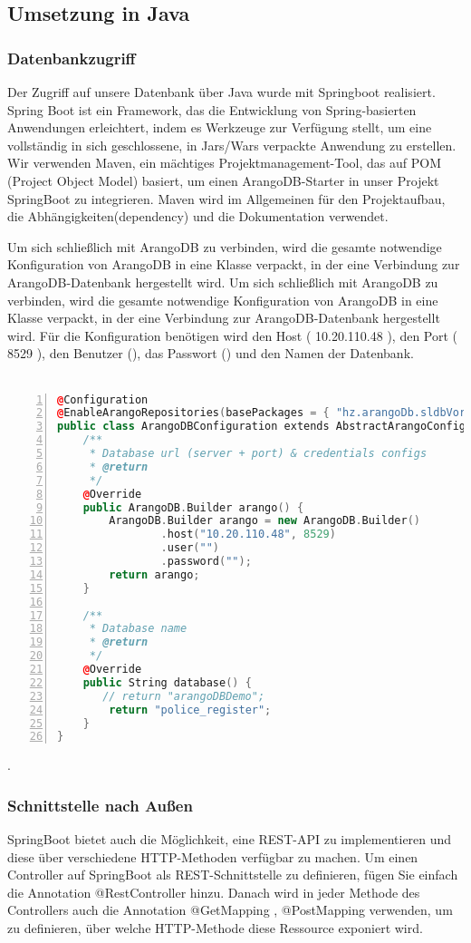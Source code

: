 \subsection{Umsetzung in Java}
\subsubsection{Datenbankzugriff}
Der Zugriff auf unsere Datenbank über Java wurde mit Springboot realisiert. Spring Boot ist ein Framework, das die Entwicklung von Spring-basierten Anwendungen erleichtert, indem es Werkzeuge zur Verfügung stellt, um eine vollständig in sich geschlossene, in Jars/Wars verpackte Anwendung zu erstellen. Wir verwenden Maven, ein mächtiges Projektmanagement-Tool, das auf  POM (Project Object Model) basiert, um einen ArangoDB-Starter in unser Projekt SpringBoot zu integrieren. Maven wird im Allgemeinen für den Projektaufbau, die Abhängigkeiten(dependency) und die Dokumentation verwendet.

Um sich schließlich mit ArangoDB zu verbinden, wird die gesamte notwendige Konfiguration von ArangoDB in eine Klasse verpackt, in der eine Verbindung zur ArangoDB-Datenbank hergestellt wird. Um sich schließlich mit ArangoDB zu verbinden, wird die gesamte notwendige Konfiguration von ArangoDB in eine Klasse verpackt, in der eine Verbindung zur ArangoDB-Datenbank hergestellt wird. Für die Konfiguration benötigen wird den Host ( 10.20.110.48 ), den Port ( 8529 ), den Benutzer (),  das Passwort () und den Namen der Datenbank.
\\ \\
\begin{lstlisting}[numbers=left,language=c++, caption={Datenbank-Konfiguration}]
@Configuration
@EnableArangoRepositories(basePackages = { "hz.arangoDb.sldbVorlesungProjekt" })
public class ArangoDBConfiguration extends AbstractArangoConfiguration {
    /**
     * Database url (server + port) & credentials configs
     * @return
     */
    @Override
    public ArangoDB.Builder arango() {
        ArangoDB.Builder arango = new ArangoDB.Builder()
                .host("10.20.110.48", 8529)
                .user("")
                .password("");
        return arango;
    }

    /**
     * Database name
     * @return
     */
    @Override
    public String database() {
       // return "arangoDBDemo";
        return "police_register";
    }
}
\end{lstlisting}

.\subsubsection{Schnittstelle nach Außen}
SpringBoot bietet auch die Möglichkeit, eine REST-API zu implementieren und diese über verschiedene HTTP-Methoden verfügbar zu machen. Um einen Controller auf SpringBoot als REST-Schnittstelle zu definieren, fügen Sie einfach die Annotation @RestController hinzu. Danach wird  in jeder Methode des Controllers auch die Annotation @GetMapping , @PostMapping verwenden, um zu definieren, über welche HTTP-Methode diese Ressource exponiert wird.
